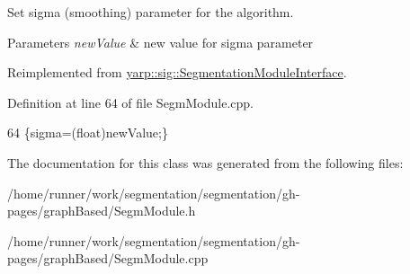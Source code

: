Set sigma (smoothing) parameter for the algorithm. 


\begin{DoxyParams}{Parameters}
{\em new\+Value} & new value for sigma parameter \\
\hline
\end{DoxyParams}


Reimplemented from \hyperlink{classyarp_1_1sig_1_1SegmentationModuleInterface_a68f28930df5e930934c0ee56ad1f680c}{yarp\+::sig\+::\+Segmentation\+Module\+Interface}.



Definition at line 64 of file Segm\+Module.\+cpp.


\begin{DoxyCode}
64 \{sigma=(float)newValue;\}
\end{DoxyCode}


The documentation for this class was generated from the following files\+:\begin{DoxyCompactItemize}
\item 
/home/runner/work/segmentation/segmentation/gh-\/pages/graph\+Based/Segm\+Module.\+h\item 
/home/runner/work/segmentation/segmentation/gh-\/pages/graph\+Based/Segm\+Module.\+cpp\end{DoxyCompactItemize}
